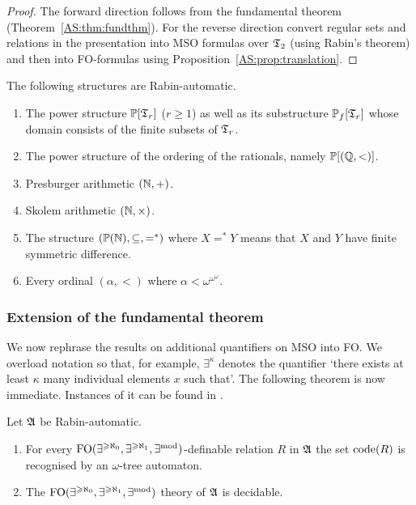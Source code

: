 \begin{proof}
The forward direction follows from the fundamental theorem (Theorem~\ref{AS:thm:fundthm}). For the reverse direction convert regular sets and relations in the presentation
into MSO formulas over $\mathfrak{T}_2$ (using Rabin's theorem) and then into FO-formulas using Proposition~\ref{AS:prop:translation}.
\end{proof}

\begin{example}
 The following structures are Rabin-automatic. 
\begin{enumerate}
 \item The power structure ${\mathbb P}[\mathfrak{T}_r]$ ($r \geq 1$) as well as its substructure ${\mathbb P}_f[\mathfrak{T}_r]$ whose domain consists of the finite subsets of $\mathfrak{T}_r$.
 \item The power structure of the ordering of the rationals, namely ${\mathbb P}[(\mathbb{Q},<)]$.
 \item Presburger arithmetic $(\mathbb{N},+)$.
 \item Skolem arithmetic $(\mathbb{N},\times)$.
 \item The structure $({\mathbb P}(\mathbb{N}),\subseteq, =^*)$ where $X =^* Y$ means that $X$ and $Y$ have finite symmetric difference.
 \item Every ordinal $(\alpha,<)$ where $\alpha < \omega^{\omega^\omega}$.
\end{enumerate}
\end{example}


\subsubsection*{Extension of the fundamental theorem}

We now rephrase the results on additional quantifiers on MSO into FO. We overload notation so that, for example, $\exists^\kappa$ denotes the quantifier `there exists at least $\kappa$ many individual elements $x$ such that'. The following theorem is now immediate. Instances of it can be found in \cite{BlGr00,KRS04,KuLo08JSL}.

\begin{theorem} \label{AS:thm:FOext}
Let $\mathfrak{A}$ be Rabin-automatic.
\begin{enumerate}
\item For every $\mbox{\rm FO}(\exists^{\geqslant \aleph_0},\exists^{\geqslant \aleph_1},\exists^{\rm mod})$-definable relation $R$ in $\mathfrak{A}$ the set ${\rm code}({R})$ is recognised by an $\omega$-tree  automaton.
\item The $\mbox{\rm FO}(\exists^{\geqslant \aleph_0},\exists^{\geqslant \aleph_1},\exists^{\rm mod})$ theory of $\mathfrak{A}$ is decidable.
\end{enumerate}
\end{theorem}

